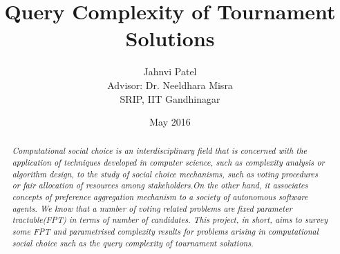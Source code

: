 \documentclass{article}
\title{\textbf{Query Complexity of Tournament Solutions}}
\author{Jahnvi Patel \\ Advisor: Dr. Neeldhara Misra\\SRIP, IIT Gandhinagar}
\date{May 2016}
\begin{document}
\begin{titlepage}
\maketitle

\begin{abstract}
 \textit{Computational social choice is an interdisciplinary field that is concerned with the application of techniques developed in computer science, such as complexity analysis or algorithm design, to the study of social choice mechanisms, such as voting procedures or fair allocation of resources among stakeholders.On the other hand, it associates concepts of preference aggregation mechanism to a society of autonomous software agents. We know that a number of voting related problems are fixed parameter tractable(FPT) in terms of number of candidates. This project, in short, aims to survey some FPT and parametrised complexity results for problems arising in computational social choice such as the query complexity of tournament solutions. }   
\end{abstract}

\end{titlepage}
\end{document}
